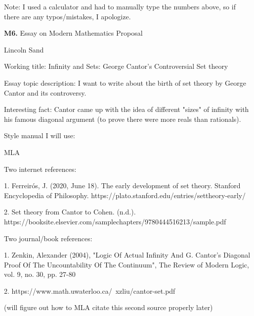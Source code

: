 \documentclass{article}
\begin{document}
Note: I used a calculator and had to manually type the numbers above, so if there
are any typos/mistakes, I apologize.

\newpage

\textbf{M6.} Essay on Modern Mathematics Proposal

Lincoln Sand

Working title: Infinity and Sets: George Cantor's Controversial Set theory

Essay topic description: I want to write about the birth of set theory by George Cantor
and its controversy.

Interesting fact: Cantor came up with the idea of different "sizes"
of infinity with his famous diagonal argument
(to prove there were more reals than rationals).

Style manual I will use:

MLA

Two internet references:

1. Ferreirós, J. (2020, June 18). The early development of set theory. Stanford Encyclopedia of Philosophy. https://plato.stanford.edu/entries/settheory-early/ 

2. Set theory from Cantor to Cohen. (n.d.). https://booksite.elsevier.com/samplechapters/9780444516213/sample.pdf

Two journal/book references:

1. Zenkin, Alexander (2004), "Logic Of Actual Infinity And G. Cantor's Diagonal Proof Of The Uncountability Of The Continuum", The Review of Modern Logic, vol. 9, no. 30, pp. 27-80

2. https://www.math.uwaterloo.ca/~xzliu/cantor-set.pdf

(will figure out how to MLA citate this second source properly later)
\end{document}

